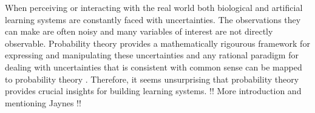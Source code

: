\documentclass[../thesis.tex]{subfiles}
\begin{document}
% 
% 
% 
% 

When perceiving or interacting with the real world both biological and artificial learning systems are constantly faced with uncertainties. The observations they can make are often noisy and many variables of interest are not directly observable. Probability theory provides a mathematically rigourous framework for expressing and manipulating these uncertainties and any rational paradigm for dealing with uncertainties that is consistent with common sense can be mapped to probability theory \parencite{cox1946probability}. Therefore, it seems unsurprising that probability theory provides crucial insights for building learning systems. !! More introduction and mentioning Jaynes !!
\end{document}
